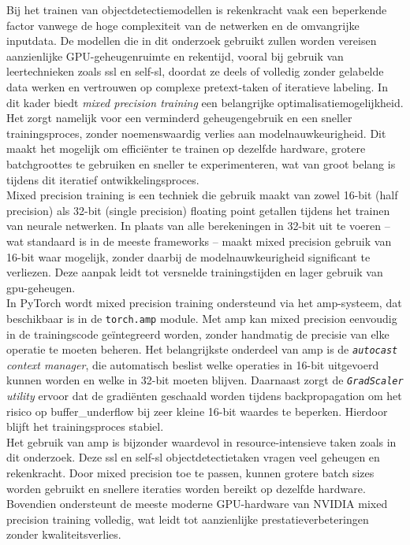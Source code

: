 Bij het trainen van objectdetectiemodellen is rekenkracht vaak een beperkende factor vanwege de hoge complexiteit van de netwerken en de omvangrijke inputdata. De modellen die in dit onderzoek gebruikt zullen worden vereisen aanzienlijke GPU-geheugenruimte en rekentijd, vooral bij gebruik van leertechnieken zoals \gls{ssl} en \gls{self-sl}, doordat ze deels of volledig zonder gelabelde data werken en vertrouwen op complexe pretext-taken of iteratieve labeling. In dit kader biedt \emph{mixed precision training} een belangrijke optimalisatiemogelijkheid. Het zorgt namelijk voor een verminderd geheugengebruik en een sneller trainingsproces, zonder noemenswaardig verlies aan modelnauwkeurigheid. Dit maakt het mogelijk om efficiënter te trainen op dezelfde hardware, grotere batchgroottes te gebruiken en sneller te experimenteren, wat van groot belang is tijdens dit iteratief ontwikkelingsproces. \\

Mixed precision training is een techniek die gebruik maakt van zowel 16-bit (half precision) als 32-bit (single precision) floating point getallen tijdens het trainen van neurale netwerken. In plaats van alle berekeningen in 32-bit uit te voeren -- wat standaard is in de meeste frameworks -- maakt mixed precision gebruik van 16-bit waar mogelijk, zonder daarbij de modelnauwkeurigheid significant te verliezen. Deze aanpak leidt tot versnelde trainingstijden en lager gebruik van \acrshort{gpu}-geheugen. \\

In PyTorch wordt mixed precision training ondersteund via het \gls{amp}-systeem, dat beschikbaar is in de \texttt{torch.amp} module. Met \gls{amp} kan mixed precision eenvoudig in de trainingscode geïntegreerd worden, zonder handmatig de precisie van elke operatie te moeten beheren. Het belangrijkste onderdeel van \gls{amp} is de \emph{\texttt{autocast} context manager}, die automatisch beslist welke operaties in 16-bit uitgevoerd kunnen worden en welke in 32-bit moeten blijven. Daarnaast zorgt de \emph{\texttt{GradScaler} utility} ervoor dat de gradiënten geschaald worden tijdens \gls{backpropagation} om het risico op \gls{buffer_underflow} bij zeer kleine 16-bit waardes te beperken. Hierdoor blijft het trainingsproces stabiel. \\

Het gebruik van \gls{amp} is bijzonder waardevol in resource-intensieve taken zoals in dit onderzoek. Deze \gls{ssl} en \gls{self-sl} objectdetectietaken vragen veel geheugen en rekenkracht. Door mixed precision toe te passen, kunnen grotere batch sizes worden gebruikt en snellere iteraties worden bereikt op dezelfde hardware. Bovendien ondersteunt de meeste moderne \gls{GPU}-hardware van NVIDIA mixed precision training volledig, wat leidt tot aanzienlijke prestatieverbeteringen zonder kwaliteitsverlies.

